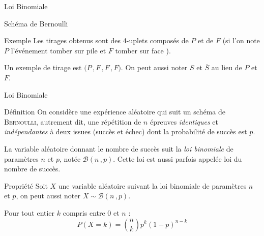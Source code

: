\documentclass{cours}
\begin{document}
\begin{Gpartie}{Loi Binomiale}
\begin{Spartie}{Schéma de Bernoulli}
\begin{SSpartie}{Exemple}
                Les tirages obtenus sont des 4-uplets composés de $P$ et de $F$ (si l'on note $P$ l'événement \og tomber sur pile \fg{} et $F$ \og tomber sur face \fg{}).
                
                Un exemple de tirage est $\big(P\,, F\,, F\,, F\big)$. On peut aussi noter $S$ et $\overline{S}$ au lieu de $P$ et $F$.
            \end{SSpartie}
        \end{Spartie}
        \pagebreak
        \begin{Spartie}{Loi Binomiale} 
            \begin{SSpartie}{Définition} 
                On considère une expérience aléatoire qui suit un schéma de \textsc{Bernoulli}, autrement dit, une répétition de $n$ épreuves \emph{identiques} et \emph{indépendantes} à deux issues (succès et échec) dont la probabilité de succès est $p$.

                La variable aléatoire donnant le nombre de succès suit la \emph{loi binomiale} de paramètres $n$ et $p$, notée $\mathcal{B}(n\,, p)$. Cette loi est aussi parfois appelée loi du nombre de succès.
            \end{SSpartie}
            \begin{SSpartie}{Propriété} 
                Soit $X$ une variable aléatoire suivant la loi binomiale de paramètres $n$ et $p$, on peut aussi noter $X\sim\mathcal{B}(n\,, p)$.

                Pour tout entier $k$ compris entre $0$ et $n$ :
                \[\boxed{P(X=k)=\binom{n}{k}p^k(1-p)^{n-k}}\]


\end{SSpartie}
\end{Spartie}
\end{Gpartie}
\end{document}
